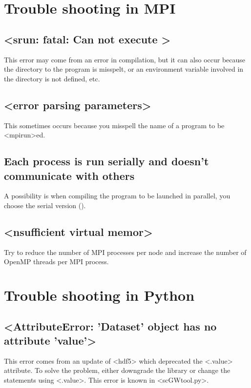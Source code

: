 \documentclass[hyperref, a4paper]{report}
\def\texttt#1{<#1>}%
\newcommand{\shortcode}[1]{\texttt{#1}}
\begin{document}
\section{Trouble shooting in MPI}

\subsection{\shortcode{srun: fatal: Can not execute }}

This error may come from an error in compilation,
but it can also occur because the directory to the program is misspelt,
or an environment variable involved in the directory is not defined, etc. 

\subsection{\shortcode{error parsing parameters}}

This sometimes occurs because you misspell the name of a program 
to be \shortcode{mpirun}ed.

\subsection{Each process is run serially and doesn't communicate with others}

A possibility is when compiling the program to be launched in parallel,
you choose the serial version ().

\subsection{\shortcode{nsufficient virtual memor}}

Try to reduce the number of MPI processes per node 
and increase the number of OpenMP threads per MPI process.

\section{Trouble shooting in Python}

\subsection{\shortcode{AttributeError: 'Dataset' object has no attribute 'value'}}

This error comes from an update of \shortcode{hdf5} 
which deprecated the \shortcode{.value} attribute.
To solve the problem, 
either downgrade the library 
or change the statements using \shortcode{.value}.
This error is known in \shortcode{scGWtool.py}.
\end{document}
